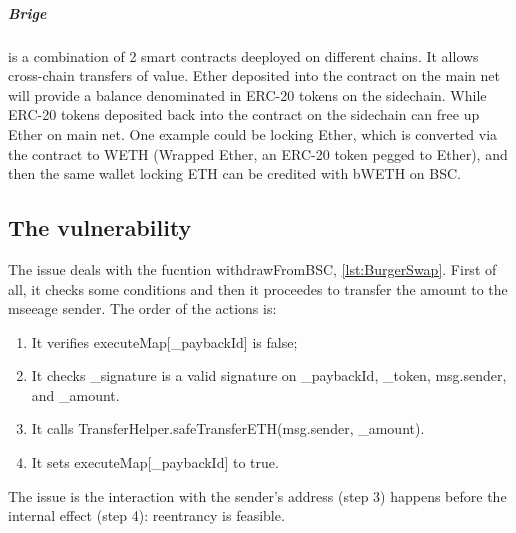 \subparagraph{Brige} is a combination of 2 smart contracts deeployed on different chains. 
It allows cross-chain transfers of value. Ether deposited into the contract on 
the main net will provide a balance denominated in ERC-20 tokens on the sidechain. 
While ERC-20 tokens deposited back into the contract on the sidechain can free up Ether on main net.
One example could be locking Ether, which is converted via the contract to WETH 
(Wrapped Ether, an ERC-20 token pegged to Ether), and then the same wallet locking ETH can be credited with bWETH on BSC.

\subsection{The vulnerability}
\label{sec:BurgerSwap:Vulnerability}

The issue deals with the fucntion withdrawFromBSC, \autoref{lst:BurgerSwap}. 
First of all, it checks some conditions and then it proceedes to transfer the amount to the mseeage sender. 
The order of the actions is:
\begin{enumerate}
    \item It verifies executeMap[\_paybackId] is false;
    \item It checks \_signature is a valid signature on \_paybackId, \_token, msg.sender, and \_amount.
    \item It calls TransferHelper.safeTransferETH(msg.sender, \_amount).
    \item It sets executeMap[\_paybackId] to true.
\end{enumerate}

The issue is the interaction with the sender's address (step 3) happens before the internal effect (step 4): reentrancy is feasible.

